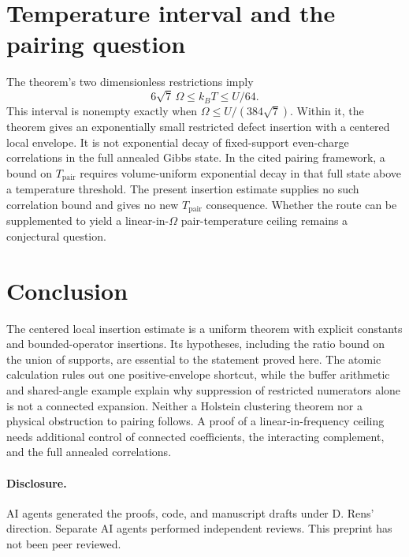 \documentclass[11pt]{article}
\theoremstyle{remark}
\begin{document}
\section{Temperature interval and the pairing question}

The theorem's two dimensionless restrictions imply
\[
 6\sqrt7\,\Omega\le k_BT\le U/64.
\]
This interval is nonempty exactly when $\Omega\le U/(384\sqrt7)$. Within it, the theorem gives an exponentially small restricted defect insertion with a centered local envelope. It is not exponential decay of fixed-support even-charge correlations in the full annealed Gibbs state. In the cited pairing framework, a bound on $T_{\mathrm{pair}}$ requires volume-uniform exponential decay in that full state above a temperature threshold. The present insertion estimate supplies no such correlation bound and gives no new $T_{\mathrm{pair}}$ consequence. Whether the route can be supplemented to yield a linear-in-$\Omega$ pair-temperature ceiling remains a conjectural question.

\section{Conclusion}

The centered local insertion estimate is a uniform theorem with explicit constants and bounded-operator insertions. Its hypotheses, including the ratio bound on the union of supports, are essential to the statement proved here. The atomic calculation rules out one positive-envelope shortcut, while the buffer arithmetic and shared-angle example explain why suppression of restricted numerators alone is not a connected expansion. Neither a Holstein clustering theorem nor a physical obstruction to pairing follows. A proof of a linear-in-frequency ceiling needs additional control of connected coefficients, the interacting complement, and the full annealed correlations.

\paragraph{Disclosure.} AI agents generated the proofs, code, and manuscript drafts under D. Rens' direction. Separate AI agents performed independent reviews. This preprint has not been peer reviewed.



\end{document}
